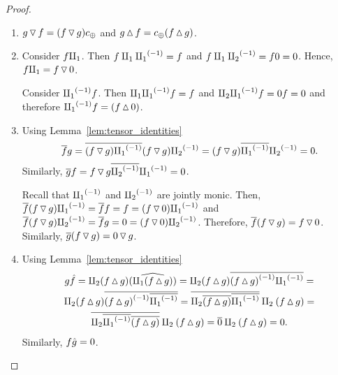 \begin{proof}
  \prepprooflist
  \begin{enumerate}[{(}i{)}]
    \item $g \tjdown f = (f \tjdown g)\comp $ and $g \tjup f = \comp(f\tjup g)$.
    \item Consider $f \cpa$. Then $f \cpa \icpa = f$ and
      $f \cpa \icpb = f 0 = 0$. Hence, $f \cpa = f \tjdown 0$.

      Consider $\icpa f$. Then $\cpa \icpa f = f$ and
      $\cpb \icpa f = 0 f = 0$ and therefore $\icpa f = (f\tjup 0)$.
    \item Using Lemma~\ref{lem:tensor_identities}
      \[
        \rst{f}g = \rst{(f\tjdown g)\icpa} (f\tjdown g)\icpb =
          (f\tjdown g) \rst{\icpa} \icpb = 0.
      \]
      Similarly, $\rst{g}f = f\tjdown g \rst{\icpb}\icpa = 0$.

      Recall that $\icpa$ and $\icpb$ are jointly monic. Then,
      $\rst{f}(f \tjdown g) \icpa = \rst{f} f = f = (f\tjdown 0) \icpa$ and
      $\rst{f}(f \tjdown g) \icpb = \rst{f}g = 0= (f\tjdown 0) \icpb$.
      Therefore, $\rst{f}(f \tjdown g) = f \tjdown 0$. Similarly,
      $\rst{g}(f \tjdown g) = 0 \tjdown g$.
    \item Using Lemma~\ref{lem:tensor_identities}
      \begin{multline*}
        g\rg{f} = \cpb(f\tjup g)\wrg{(\cpa(f\tjup g))}  =
          \cpb(f\tjup g) \rst{\inv{(f\tjup g)}\icpa} =\\
          \cpb(f\tjup g) \rst{\inv{(f\tjup g)}\rst{\icpa}} =
          \rst{\cpb \rst{(f\tjup g)} \rst{\icpa}}\cpb(f\tjup g) = \\
          \rst{\cpb \rst{\icpa}\rst{(f\tjup g)} }\cpb(f\tjup g) =
          \rst{0}\cpb(f\tjup g) = 0.
      \end{multline*}
      Similarly, $f\rg{g} =  0$.


\end{enumerate}
\end{proof}
